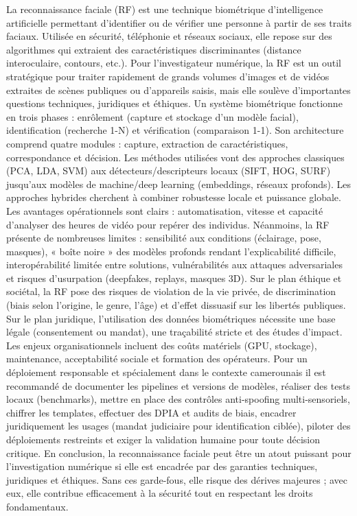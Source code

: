 \documentclass[12pt]{article}
\begin{document}
La reconnaissance faciale (RF) est une technique biométrique d’intelligence artificielle permettant d’identifier ou de vérifier une personne à partir de ses traits faciaux. Utilisée en sécurité, téléphonie et réseaux sociaux, elle repose sur des algorithmes qui extraient des caractéristiques discriminantes (distance interoculaire, contours, etc.). Pour l’investigateur numérique, la RF est un outil stratégique pour traiter rapidement de grands volumes d’images et de vidéos extraites de scènes publiques ou d’appareils saisis, mais elle soulève d’importantes questions techniques, juridiques et éthiques. Un système biométrique fonctionne en trois phases : enrôlement (capture et stockage d’un modèle facial), identification (recherche 1-N) et vérification (comparaison 1-1). Son architecture comprend quatre modules : capture, extraction de caractéristiques, correspondance et décision. Les méthodes utilisées vont des approches classiques (PCA, LDA, SVM) aux détecteurs/descripteurs locaux (SIFT, HOG, SURF) jusqu’aux modèles de machine/deep learning (embeddings, réseaux profonds). Les approches hybrides cherchent à combiner robustesse locale et puissance globale. Les avantages opérationnels sont clairs : automatisation, vitesse et capacité d’analyser des heures de vidéo pour repérer des individus. Néanmoins, la RF présente de nombreuses limites : sensibilité aux conditions (éclairage, pose, masques), « boîte noire » des modèles profonds rendant l’explicabilité difficile, interopérabilité limitée entre solutions, vulnérabilités aux attaques adversariales et risques d’usurpation (deepfakes, replays, masques 3D). Sur le plan éthique et sociétal, la RF pose des risques de violation de la vie privée, de discrimination (biais selon l’origine, le genre, l’âge) et d’effet dissuasif sur les libertés publiques. Sur le plan juridique, l’utilisation des données biométriques nécessite une base légale (consentement ou mandat), une traçabilité stricte et des études d’impact. Les enjeux organisationnels incluent des coûts matériels (GPU, stockage), maintenance, acceptabilité sociale et formation des opérateurs. Pour un déploiement responsable et spécialement dans le contexte camerounais il est recommandé de documenter les pipelines et versions de modèles, réaliser des tests locaux (benchmarks), mettre en place des contrôles anti-spoofing multi-sensoriels, chiffrer les templates, effectuer des DPIA et audits de biais, encadrer juridiquement les usages (mandat judiciaire pour identification ciblée), piloter des déploiements restreints et exiger la validation humaine pour toute décision critique. En conclusion, la reconnaissance faciale peut être un atout puissant pour l’investigation numérique si elle est encadrée par des garanties techniques, juridiques et éthiques. Sans ces garde-fous, elle risque des dérives majeures ; avec eux, elle contribue efficacement à la sécurité tout en respectant les droits fondamentaux.

\vspace{1cm}
\end{document}
